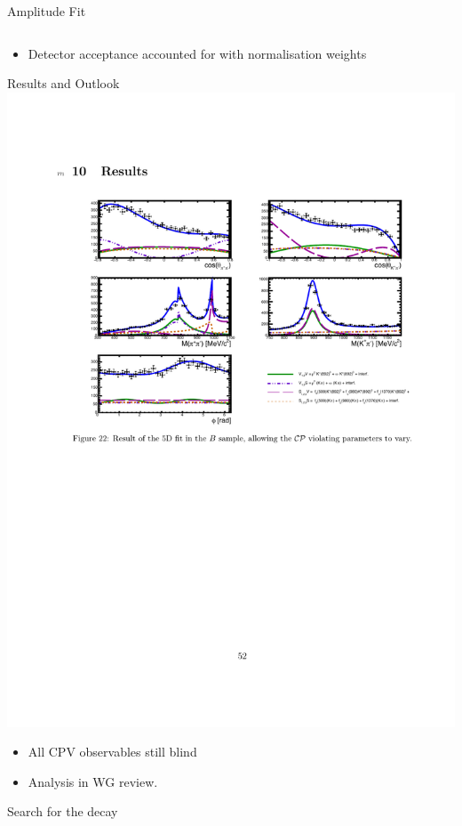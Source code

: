 \documentclass{beamer}
\def\LbpkEtapr {\decay{\Lb}{\proton\kaon\etapr}\xspace}
\begin{document}
\begin{frame}{Amplitude Fit}
\begin{columns}
\begin{column}{0.69\textwidth}
    \end{column}
  \end{columns}
  \begin{itemize}
  \item Detector acceptance accounted for with normalisation weights
  \end{itemize}
\end{frame}

\begin{frame}{Results and Outlook}
  \includegraphics[width=.75\textwidth]{FiveBodyFitResults.pdf}
  \begin{itemize}
  \item All CPV observables still blind
  \item Analysis in WG review.
  \end{itemize}
\end{frame}

\begin{frame}
  \begin{block}{}
    \centering \Huge Search for the decay  \LbpkEtapr
  \end{block}
\end{frame}
\end{document}
